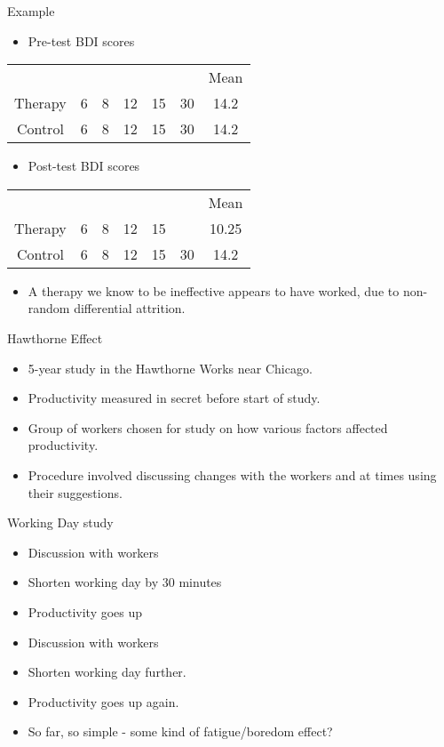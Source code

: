 \documentclass{beamer}
\begin{document}
\begin{frame}{Example}
\begin{itemize}
\item Pre-test BDI scores
\end{itemize}
\begin{tabular} {c c c c c c c}
 &  &  &  &  &  & Mean \\
Therapy	& 6 & 8	& 12 & 15 & 30 & 14.2 \\
Control	& 6 & 8	& 12 & 15 & 30 & 14.2 \\
\end{tabular} 
\begin{itemize}
\item Post-test BDI scores
\end{itemize}
\begin{tabular} {c c c c c c c}
 &  &  &  &  &  & Mean \\
Therapy	& 6 & 8	& 12 & 15 &  & 10.25 \\
Control	& 6 & 8	& 12 & 15 & 30 & 14.2 \\
\end{tabular} 

\vspace{12 pt}
\begin{itemize}
\item A therapy we know to be ineffective appears to have worked, due to non-random differential attrition.
\end{itemize}
\end{frame}


\begin{frame}{Hawthorne Effect}
\begin{itemize}
\item 5-year study in the Hawthorne Works near Chicago.
\item Productivity measured in secret before start of study.
\item Group of workers chosen for study on how various factors affected productivity.
\item Procedure involved discussing changes with the workers and at times using their suggestions.
\end{itemize}
\end{frame}

\begin{frame}{Working Day study}
\begin{itemize}
\item Discussion with workers
\item Shorten working day by 30 minutes
\item Productivity goes up
\item Discussion with workers
\item Shorten working day further.
\item Productivity goes up again.
\item So far, so simple - some kind of fatigue/boredom effect?
\end{itemize}
\end{frame}
\end{document}
